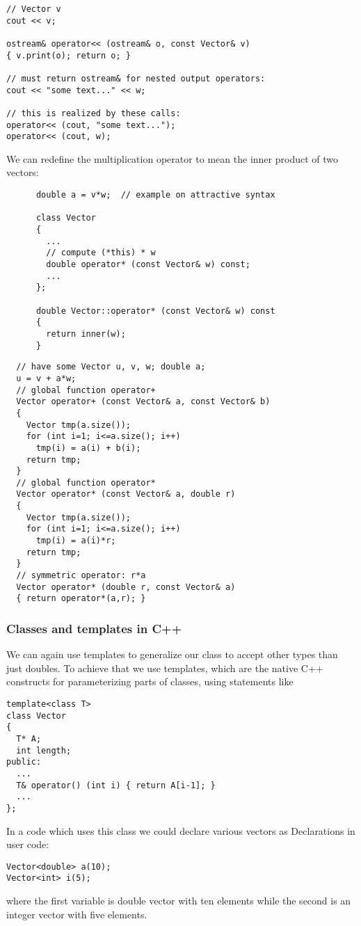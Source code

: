 \begin{lstlisting}
// Vector v
cout << v;

ostream& operator<< (ostream& o, const Vector& v)
{ v.print(o); return o; }

// must return ostream& for nested output operators:
cout << "some text..." << w;

// this is realized by these calls:
operator<< (cout, "some text...");
operator<< (cout, w);
\end{lstlisting}

We can redefine the multiplication operator to mean the inner product of two vectors:
\begin{lstlisting}
      double a = v*w;  // example on attractive syntax

      class Vector
      { 
        ...
        // compute (*this) * w
        double operator* (const Vector& w) const;
        ...
      };

      double Vector::operator* (const Vector& w) const
      {
        return inner(w);
      }
\end{lstlisting}

\begin{lstlisting}
  // have some Vector u, v, w; double a;
  u = v + a*w;
  // global function operator+
  Vector operator+ (const Vector& a, const Vector& b)
  {
    Vector tmp(a.size());
    for (int i=1; i<=a.size(); i++)
      tmp(i) = a(i) + b(i);
    return tmp;
  }
  // global function operator*
  Vector operator* (const Vector& a, double r)
  {
    Vector tmp(a.size());
    for (int i=1; i<=a.size(); i++)
      tmp(i) = a(i)*r;
    return tmp;
  }
  // symmetric operator: r*a
  Vector operator* (double r, const Vector& a)
  { return operator*(a,r); }
\end{lstlisting}

\subsubsection{Classes and templates in C++}

We can again use templates to generalize our class to accept other types than just doubles.
To achieve that we use templates, which are the native C++ constructs for parameterizing parts of classes,
using statements like
\begin{lstlisting}
template<class T>
class Vector
{
  T* A;
  int length;
public:
  ...
  T& operator() (int i) { return A[i-1]; }
  ...
};
\end{lstlisting}
In a code which uses this class we could declare various vectors as
 Declarations in user code:
\begin{lstlisting}
Vector<double> a(10);
Vector<int> i(5);
\end{lstlisting}
where the first variable is double vector with ten elements while the second is an integer vector
with five elements.

